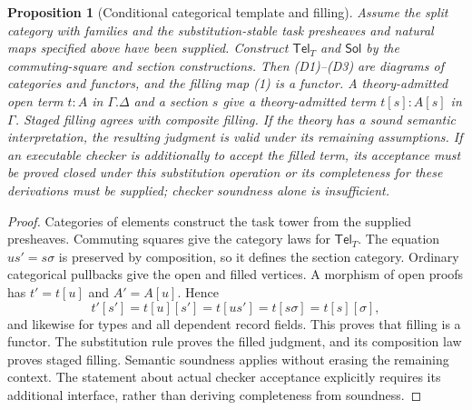 \documentclass[11pt]{article}
\newtheorem{proposition}[definition]{Proposition}
\newcommand{\Cat}[1]{\mathsf{#1}}
\begin{document}
\begin{proposition}[Conditional categorical template and filling]
Assume the split category with families and the substitution-stable task
presheaves and natural maps specified above have been supplied. Construct
$\Cat{Tel}_T$ and $\Cat{Sol}$ by the commuting-square and section
constructions. Then (D1)--(D3) are diagrams of categories and functors,
and the filling map (1) is a functor. A theory-admitted open term $t:A$
in $\Gamma.\Delta$ and a section $s$ give a theory-admitted term
$t[s]:A[s]$ in $\Gamma$. Staged filling agrees with composite filling.
If the theory has a sound semantic interpretation, the resulting
judgment is valid under its remaining assumptions. If an executable
checker is additionally to accept the filled term, its acceptance must
be proved closed under this substitution operation or its completeness
for these derivations must be supplied; checker soundness alone is
insufficient.
\end{proposition}
\begin{proof}
Categories of elements construct the task tower from the supplied
presheaves. Commuting squares give the category laws for
$\Cat{Tel}_T$. The equation $us'=s\sigma$ is preserved by composition,
so it defines the section category. Ordinary categorical pullbacks give
the open and filled vertices. A morphism of open proofs has
$t'=t[u]$ and $A'=A[u]$. Hence
\[
 t'[s']=t[u][s']=t[us']=t[s\sigma]=t[s][\sigma],
\]
and likewise for types and all dependent record fields. This proves
that filling is a functor. The substitution rule proves the filled
judgment, and its composition law proves staged filling. Semantic
soundness applies without erasing the remaining context. The statement
about actual checker acceptance explicitly requires its additional
interface, rather than deriving completeness from soundness.
\end{proof}
\end{document}

